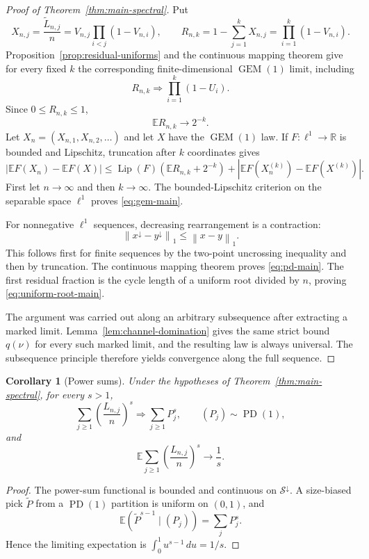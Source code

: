 \documentclass[11pt]{article}
\newtheorem{corollary}[theorem]{Corollary}
\theoremstyle{definition}
\theoremstyle{remark}
\newcommand{\Ee}{\mathbb E}
\newcommand{\PD}{\operatorname{PD}}
\newcommand{\GEM}{\operatorname{GEM}}
\newcommand{\dd}{\,d}
\newcommand{\cS}{\mathcal S}
\newcommand{\norm}[1]{\left\lVert#1\right\rVert}
\begin{document}
\begin{proof}[Proof of Theorem~\ref{thm:main-spectral}]
Put
\begin{equation}
 X_{n,j}=\frac{\widetilde L_{n,j}}n
 =V_{n,j}\prod_{i<j}(1-V_{n,i}),
 \qquad
 R_{n,k}=1-\sum_{j=1}^kX_{n,j}
 =\prod_{i=1}^k(1-V_{n,i}).
 \label{eq:stick-breaking-finite}
\end{equation}
Proposition~\ref{prop:residual-uniforms} and the continuous mapping theorem give
for every fixed $k$ the corresponding finite-dimensional $\GEM(1)$ limit,
including
\[
 R_{n,k}\Rightarrow\prod_{i=1}^k(1-U_i).
\]
Since $0\le R_{n,k}\le1$,
\begin{equation}
 \Ee R_{n,k}\longrightarrow2^{-k}.
 \label{eq:residual-expectation}
\end{equation}
Let $X_n=(X_{n,1},X_{n,2},\ldots)$ and let $X$ have the $\GEM(1)$ law.  If
$F:\ell^1\to\mathbb R$ is bounded and Lipschitz, truncation after $k$
coordinates gives
\[
 |\Ee F(X_n)-\Ee F(X)|
 \le\operatorname{Lip}(F)(\Ee R_{n,k}+2^{-k})
 +|\Ee F(X_n^{(k)})-\Ee F(X^{(k)})|.
\]
First let $n\to\infty$ and then $k\to\infty$.  The bounded-Lipschitz criterion
on the separable space $\ell^1$ proves \eqref{eq:gem-main}.

For nonnegative $\ell^1$ sequences, decreasing rearrangement is a contraction:
\[
 \norm{x^\downarrow-y^\downarrow}_1\le\norm{x-y}_1.
\]
This follows first for finite sequences by the two-point uncrossing inequality
and then by truncation.  The continuous mapping theorem proves
\eqref{eq:pd-main}.  The first residual fraction is the cycle length of a
uniform root divided by $n$, proving \eqref{eq:uniform-root-main}.

The argument was carried out along an arbitrary subsequence after extracting a
marked limit.  Lemma~\ref{lem:channel-domination} gives the same strict bound
$q(\nu)$ for every such marked limit, and the resulting law is always universal.
The subsequence principle therefore yields convergence along the full sequence.
\end{proof}

\begin{corollary}[Power sums]
\label{cor:power-sums}
Under the hypotheses of Theorem~\ref{thm:main-spectral}, for every $s>1$,
\[
 \sum_{j\ge1}\left(\frac{L_{n,j}}n\right)^s
 \Rightarrow\sum_{j\ge1}P_j^s,
 \qquad (P_j)\sim\PD(1),
\]
and
\[
 \Ee\sum_{j\ge1}\left(\frac{L_{n,j}}n\right)^s\longrightarrow\frac1s.
\]
\end{corollary}

\begin{proof}
The power-sum functional is bounded and continuous on $\cS^\downarrow$.  A
size-biased pick $\widetilde P$ from a $\PD(1)$ partition is uniform on
$(0,1)$, and
\[
 \Ee(\widetilde P^{s-1}\mid(P_j))=\sum_jP_j^s.
\]
Hence the limiting expectation is
$\int_0^1u^{s-1}\dd u=1/s$.
\end{proof}
\end{document}

